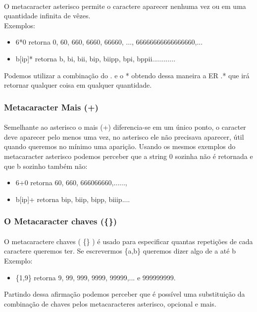 \documentclass[10pt,a4paper]{article}
\begin{document}
\paragraph*{}
O metacaracter asterisco permite o caractere aparecer nenhuma vez ou em uma quantidade infinita de vêzes.\\
Exemplos:
\begin{itemize}
\item 6*0 retorna 0, 60, 660, 6660, 66660, ..., 66666666666666660,...
\item b[ip]* retorna b, bi, bii, bip, biipp, bpi, bppii............
\end{itemize}
Podemos utilizar a combinação do . e o * obtendo dessa maneira a ER .* que irá retornar qualquer coisa em qualquer quantidade.
\subsubsection{Metacaracter Mais (+)}
\paragraph*{}
Semelhante ao asterisco o mais (+)  diferencia-se em um único ponto, o caracter deve aparecer pelo menos uma vez, no asterisco ele não precisava aparecer, útil quando queremos no mínimo uma aparição. Usando os mesmos exemplos do metacaracter asterisco podemos perceber que a string 0 sozinha não é retornada e que b sozinho também não:
\begin{itemize}
\item 6+0 retorna 60, 660, 666066660,......, 
\item b[ip]+ retorna bip, biip, bipp, biiip....
\end{itemize}
\subsubsection {O Metacaracter chaves (\{\})}
\paragraph*{}
O metacaractere chaves ( \{\} ) é usado para especificar quantas repetições de cada caractere queremos ter. Se escrevermos \{a,b\}  queremos dizer algo de a até b\\
Exemplo:
\begin{itemize}
\item \{1,9\} retorna 9,  99, 999, 9999, 99999,... e 999999999.
\end{itemize}
Partindo dessa afirmação podemos perceber que é possível uma substituição da combinação de chaves pelos metacaracteres asterisco, opcional e mais.
\end{document}
